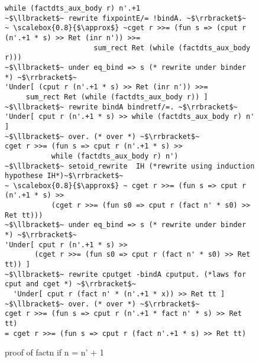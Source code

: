 \documentclass[japanese]{jssst_ppl}
\theoremstyle{definition}
\begin{document}
\begin{figure}[H]
  \centering
  \begin{verbatim}
while (factdts_aux_body r) n'.+1
~$\llbracket$~ rewrite fixpointE/= !bindA. ~$\rrbracket$~
~ \scalebox{0.8}{$\approx$} ~cget r >>= (fun s => (cput r (n'.+1 * s) >> Ret (inr n')) >>=
                     sum_rect Ret (while (factdts_aux_body r)))
~$\llbracket$~ under eq_bind => s (* rewrite under binder *) ~$\rrbracket$~
'Under[ (cput r (n'.+1 * s) >> Ret (inr n')) >>=
     sum_rect Ret (while (factdts_aux_body r)) ]
~$\llbracket$~ rewrite bindA bindretf/=. ~$\rrbracket$~
'Under[ cput r (n'.+1 * s) >> while (factdts_aux_body r) n' ]
~$\llbracket$~ over. (* over *) ~$\rrbracket$~
cget r >>= (fun s => cput r (n'.+1 * s) >>
           while (factdts_aux_body r) n')
~$\llbracket$~ setoid_rewrite  IH (*rewrite using induction hypothese IH*)~$\rrbracket$~
~ \scalebox{0.8}{$\approx$} ~ cget r >>= (fun s => cput r (n'.+1 * s) >>
           (cget r >>= (fun s0 => cput r (fact n' * s0) >> Ret tt)))
~$\llbracket$~ under eq_bind => s (* rewrite under binder *) ~$\rrbracket$~
'Under[ cput r (n'.+1 * s) >>
       (cget r >>= (fun s0 => cput r (fact n' * s0) >> Ret tt)) ]
~$\llbracket$~ rewrite cputget -bindA cputput. (*laws for cput and cget *) ~$\rrbracket$~
  'Under[ cput r (fact n' * (n'.+1 * x)) >> Ret tt ]
~$\llbracket$~ over. (* over *) ~$\rrbracket$~
cget r >>= (fun s => cput r (n'.+1 * fact n' * s) >> Ret tt)
= cget r >>= (fun s => cput r (fact n'.+1 * s) >> Ret tt)
       \end{verbatim}
  \caption{proof of factn if n =  n' + 1 }
\end{figure}
\iffalse
  その後、その書き換えとtypedstoremonadの書き換え規則を用いることで、factnに一致することを示した。

  \begin{verbatim}
  Lemma factE n : factdts n |\scalebox{0.8}{$\approx$}| factn n.

  cnew ml_int 1 >>= (fun r : loc ml_int => factdts_aux n r >> (cget r >>= [eta Ret]))
  |《 rewrite under cnew mlint 1 >>= by bindfwB 》|

  factdts_aux n a >> (cget a >>= [eta Ret])
  |《 fixpointE 》|

  |《 rewrite under cnew mlint 1 >>= by bindfwB》|
  factdts_aux n a >> (cget a >>= [eta Ret])
  |《 fixpointE 》|

  cget a >>=
  (fun x : coq_type N ml_int => (cput a (fact n * x) >> Ret tt) >> (cget a >>= [eta Ret]))
  |《 rewrite under cget a >>= by eqbind》|
  (cput a (fact n * x) >> Ret tt) >> (cget a >>= [eta Ret])
  |《 fixpointE 》|
  cput a (fact n * x) >> (cget a >>= [eta Ret])
  |《 over 》|
  cnew ml_int 1 >>=
  (fun a : loc ml_int =>
   cget a >>=
   (fun x : coq_type N ml_int => cput a (fact n * x) >> (cget a >>= [eta Ret])))
   |《 fixpointE 》|
   cnew ml_int (fact n) >>= (fun r : loc ml_int => cget r >>= [eta Ret])

\end{verbatim}
\fi
\end{document}
